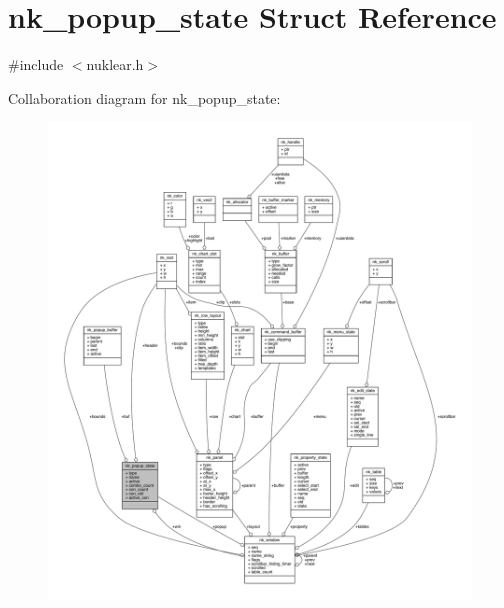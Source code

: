 \hypertarget{structnk__popup__state}{}\section{nk\+\_\+popup\+\_\+state Struct Reference}
\label{structnk__popup__state}


{\ttfamily \#include $<$nuklear.\+h$>$}



Collaboration diagram for nk\+\_\+popup\+\_\+state\+:
\nopagebreak
\begin{figure}[H]
\begin{center}
\leavevmode
\includegraphics[width=350pt]{structnk__popup__state__coll__graph}
\end{center}
\end{figure}
